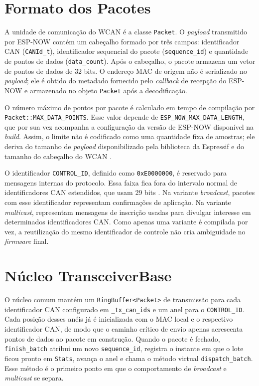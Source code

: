 \section{Formato dos Pacotes}

A unidade de comunicação do WCAN é a classe \texttt{Packet}. O \emph{payload} transmitido
por ESP-NOW contém um cabeçalho formado por três campos: identificador CAN
(\texttt{CANId\_t}), identificador sequencial do pacote
(\texttt{sequence\_id}) e quantidade de pontos de dados
(\texttt{data\_count}). Após o cabeçalho, o pacote armazena um vetor de pontos de
dados de 32 bits. O endereço MAC de origem não é serializado no \emph{payload}; ele é
obtido do metadado fornecido pelo \emph{callback} de recepção do ESP-NOW e armazenado no
objeto \texttt{Packet} após a decodificação.

O número máximo de pontos por pacote é calculado em tempo de compilação por
\texttt{Packet::MAX\_DATA\_POINTS}. Esse valor depende de
\texttt{ESP\_NOW\_MAX\_DATA\_LENGTH}, que por sua vez acompanha a configuração da
versão de ESP-NOW disponível na \emph{build}. Assim, o limite não é codificado como uma
quantidade fixa de amostras; ele deriva do tamanho de \emph{payload} disponibilizado pela
biblioteca da Espressif e do tamanho do cabeçalho do WCAN
\cite{espressif_espnow_programming_guide}.

O identificador \texttt{CONTROL\_ID}, definido como \texttt{0xE0000000}, é
reservado para mensagens internas do protocolo. Essa faixa fica fora do intervalo
normal de identificadores CAN estendidos, que usam 29 bits
\cite{iso11898_1_2024}. Na variante \emph{broadcast}, pacotes com esse identificador
representam confirmações de aplicação. Na variante \emph{multicast}, representam
mensagens de inscrição usadas para divulgar interesse em determinados
identificadores CAN. Como apenas uma variante é compilada por vez, a reutilização
do mesmo identificador de controle não cria ambiguidade no \emph{firmware} final.

\section{Núcleo TransceiverBase}

O núcleo comum mantém um \texttt{RingBuffer<Packet>} de transmissão para cada identificador CAN configurado em \texttt{\_tx\_can\_ids} e um anel para o \texttt{CONTROL\_ID}. Cada posição desses anéis já é inicializada com o MAC local e o
respectivo identificador CAN, de modo que o caminho crítico de envio apenas acrescenta
pontos de dados ao pacote em construção. Quando o
pacote é fechado, \texttt{finish\_batch} atribui um novo
\texttt{sequence\_id}, registra o instante em que o lote ficou pronto em
\texttt{Stats}, avança o anel e chama o método virtual
\texttt{dispatch\_batch}. Esse método é o primeiro ponto em que o comportamento
de \emph{broadcast} e \emph{multicast} se separa.

